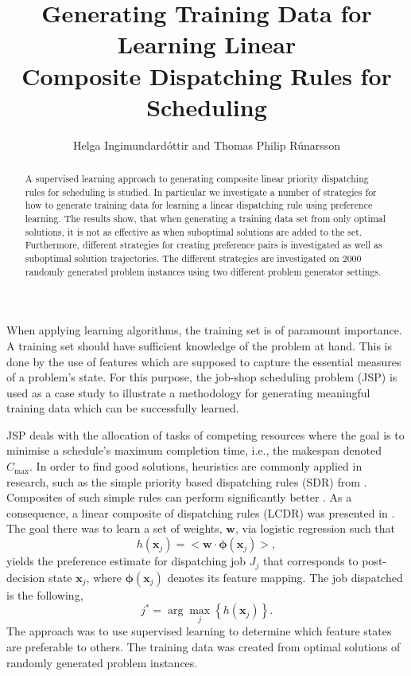\documentclass[smallextended]{llncs}
\newcommand{\vphi}{{\boldsymbol{\phi}}}
\renewcommand{\vec}[1]{\mathbf{#1}}
\newcommand{\shortcite}[1]{\cite{#1}}
\begin{document}
\title{Generating Training Data for Learning Linear \\ Composite Dispatching Rules for Scheduling}
\author{Helga Ingimundard\'ottir and Thomas Philip R\'unarsson}

\maketitle
\begin{abstract}
A supervised learning approach to generating composite linear priority dispatching rules for scheduling is studied. In particular we investigate a number of strategies for how to generate training data for learning a linear dispatching rule using preference learning. 
The results show, that when generating a training data set from only optimal solutions, it is not as effective as when suboptimal solutions are added to the set. 
Furthermore, different strategies for creating preference pairs is investigated as well as suboptimal solution trajectories. The different strategies are investigated on 2000 randomly generated problem instances using two different problem generator settings.
\end{abstract}

\noindent When applying learning algorithms, the training set is of paramount importance. A training set should have sufficient knowledge of the problem at hand. 
This is done by the use of features which are supposed to capture the essential measures of a problem's state. For this purpose, the job-shop scheduling problem (JSP) is used as a case study to illustrate a methodology for generating meaningful training data which can be successfully learned. 

JSP deals with the allocation of tasks of competing resources where the goal is to minimise a schedule's maximum completion time, i.e., the makespan denoted $C_{\max}$. In order to find good solutions, heuristics are commonly applied in research, such as the simple priority based dispatching rules (SDR) from \cite{Panwalkar77}. Composites of such simple rules can perform significantly better \cite{Jayamohan04}. 
As a consequence, a linear composite of dispatching rules (LCDR) was presented  in \shortcite{InRu11a}. The goal there was to learn a set of weights, $\vec{w}$, via logistic regression such that 
\begin{equation}\label{eq:jssp:linweights}
h(\vec{x}_j)=\big<{\vec{w}}\cdot{\vphi(\vec{x}_j)}\big>,
\end{equation}
yields the preference estimate for dispatching job $J_j$ that corresponds to post-decision state $\vec{x}_j$, where $\vphi(\vec{x}_j)$ denotes its feature mapping. The job dispatched is the following, 
\begin{equation}\label{eq:jstar}
j^* = \arg\max_j\left\{h(\vec{x}_j)\right\}. 
\end{equation}
The approach was to use supervised learning to determine which feature states are preferable to others. 
The training data was created from optimal solutions of randomly generated problem instances. 
\end{document}
